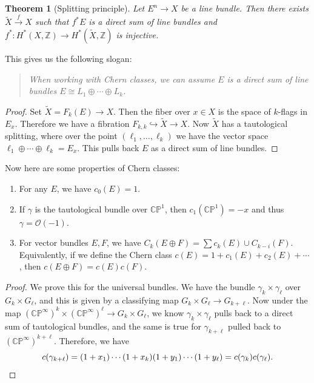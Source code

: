 \documentclass[leqno, openany]{memoir}
\newtheorem{thm}{Theorem}[section]
\theoremstyle{definition}
\theoremstyle{remark}
\theoremstyle{plain}
\theoremstyle{definition}
\theoremstyle{remark}
\newcommand{\C}{\mathbb{C}}
\newcommand{\Z}{\mathbb{Z}}
\renewcommand{\P}{\mathbb{P}}
\newcommand{\mc}[1]{\mathcal{#1}}
\newcommand{\wt}[1]{\widetilde{#1}}
\begin{document}
\begin{thm}[Splitting principle]
    Let $E^n \to X$ be a line bundle. Then there exists $\wt{X} \xrightarrow{f} X$ such that $f^* E$ is a direct sum of line bundles and $f^* \colon H^*(X, \Z) \to H^*(\wt{X}, \Z)$ is injective.
\end{thm}
This gives us the following slogan:
\begin{quotation}
    \textit{When working with Chern classes, we can assume $E$ is a direct sum of line bundles $E \cong L_1 \oplus \cdots \oplus L_k$.} 
\end{quotation}

\begin{proof}
    Set $\wt{X} = F_k(E) \to X$. Then the fiber over $x \in X$ is the space of $k$-flags in $E_x$. Therefore we have a fibration $F_{k,k} \hookrightarrow \wt{X} \to X$. Now $\wt{X}$ has a tautological splitting, where over the point $(\ell_1, \ldots, \ell_k)$ we have the vector space $\ell_1 \oplus \cdots \oplus \ell_k = E_x$. This pulls back $E$ as a direct sum of line bundles.
\end{proof}

Now here are some properties of Chern classes:
\begin{enumerate}
    \item For any $E$, we have $c_0(E) = 1$.
    \item If $\gamma$ is the tautological bundle over $\C\P^1$, then $c_1(\C\P^1) = -x$ and thus $\gamma = \mc{O}(-1)$.
    \item For vector bundles $E, F$, we have $C_k(E \oplus F) = \sum c_k(E) \cup C_{k-i}(F)$. Equivalently, if we define the Chern class $c(E) = 1 + c_1(E) + c_2(E) + \cdots$, then $c(E \oplus F) = c(E) c(F)$.
\end{enumerate}

\begin{proof}
    We prove this for the universal bundles. We have the bundle $\gamma_k \times \gamma_{\ell}$ over $G_k \times G_{\ell}$, and this is given by a classifying map $G_k \times G_{\ell} \to G_{k + \ell}$. Now under the map ${(\C\P^{\infty})}^k \times {(\C\P^{\infty})}^{\ell} \to G_k \times G_{\ell}$, we know $\gamma_k \times \gamma_{\ell}$ pulls back to a direct sum of tautological bundles, and the same is true for $\gamma_{k+\ell}$ pulled back to ${(\C\P^{\infty})}^{k + \ell}$. Therefore, we have
    \[ c(\gamma_{k + \ell}) = (1 + x_1) \cdots (1 + x_k) (1 + y_1) \cdots (1 + y_{\ell}) = c(\gamma_k) c(\gamma_{\ell}). \qedhere \]
\end{proof}
\end{document}
